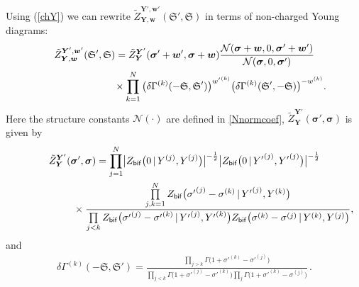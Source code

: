 \documentclass[pdftex]{sigma}
\newcommand{\cN}{{\mathcal{N}}}
\newcommand{\bs}{\boldsymbol}
\numberwithin{equation}{section}
\begin{document}
Using (\ref{chY}) we can rewrite
${\tilde{Z}}^{\bs Y', \bs w'}_{\bs Y, \bs w} (\mathfrak S', \mathfrak S)$ in terms of non-charged Young diagrams:
\begin{gather}
{\tilde{Z}}^{\bs Y', \bs w'}_{\bs Y, \bs w} (\mathfrak S', \mathfrak S) =
{\tilde{Z}}^{\bs Y'}_{\bs Y} (\bs \sigma'+ \bs w', \bs\sigma+ \bs w )
\frac{\cN(\bs\sigma+\bs w, 0,\bs\sigma'+\bs w')}{\cN(\bs\sigma,0,\bs\sigma')}\nonumber \\
\hphantom{{\tilde{Z}}^{\bs Y', \bs w'}_{\bs Y, \bs w} (\mathfrak S', \mathfrak S) =}{} \times \prod_{k=1}^N
\big(\delta \Gamma^{(k)}(-\mathfrak S,\mathfrak S')\big) ^{{w'}^{(k)}}
\big(\delta \Gamma^{(k)}(\mathfrak S',-\mathfrak S)\big)^{-{w}^{(k)}}.\label{Zhhat}
\end{gather}
Here the structure constants $\cN(\cdot)$ are defined in \eqref{Nnormcoef}, ${\tilde{Z}}^{\bs Y'}_{\bs Y} (\bs \sigma', \bs\sigma)$ is given by
\begin{gather}
{\tilde{Z}}^{\bs Y'}_{\bs Y} (\bs \sigma', \bs\sigma )=
\prod_{j=1}^N \bigl|Z_{\mathsf{bif}}\big(0\,|\,Y^{(j)},Y^{(j)}\big)\bigr|^{-\frac12}
\bigl|Z_{\mathsf{bif}}\big(0\,|\,{Y'}^{(j)},{Y'}^{(j)}\big)\bigr|^{-\frac12} \nonumber\\
\hphantom{{\tilde{Z}}^{\bs Y'}_{\bs Y} (\bs \sigma', \bs\sigma )=}{}
\times \frac{\prod\limits_{j,k=1}^N Z_{\mathsf{bif}}\big({\sigma'}^{(j)}-\sigma^{(k)}\,|\,{Y'}^{(j)},Y^{(k)}\big)}
{ \prod\limits_{j<k} Z_{\mathsf{bif}}\bigl({\sigma'}^{(j)}-{\sigma'}^{(k)} \,|\,
{Y'}^{(j)},{Y'}^{(k)}\bigr) { Z_{\mathsf{bif}}\big({\sigma}^{(k)}-{\sigma}^{(j)}\,|\, Y^{(k)},Y^{(j)}\big)}},
\end{gather}
and
\begin{gather}\label{dGamma}
\delta \Gamma^{(k)}(-\mathfrak S,\mathfrak S') =
\frac{\prod\limits_{j>k} \Gamma \big(1+{\sigma'}^{(k)}-{\sigma'}^{(j)} \big)}
{\prod\limits_{j<k} \Gamma \big(1+{\sigma'}^{(j)}-{\sigma'}^{(k)}\big) \prod\limits_j\Gamma \big( 1+{\sigma'}^{(k)}-{\sigma}^{(j)}\big)}\,.
\end{gather}
\end{document}
